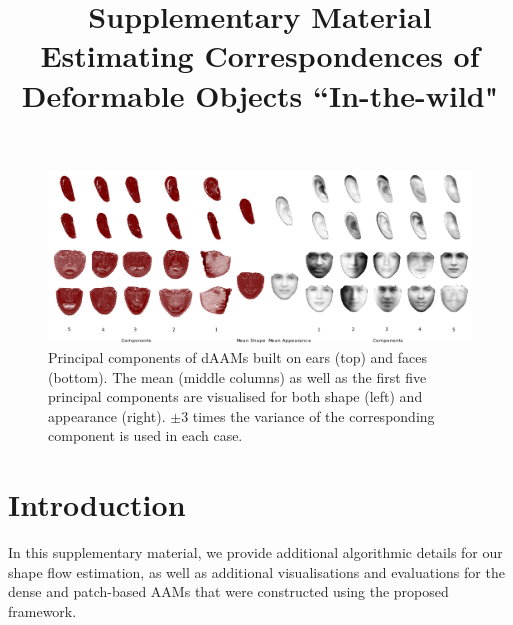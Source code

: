 






\title{Supplementary Material \\ Estimating Correspondences of Deformable Objects ``In-the-wild"}

\maketitle
\thispagestyle{empty}

\begin{figure}[!b]
\centering
\includegraphics[width=\textwidth]{Suplementory_Meterial/Models/models}
\caption{Principal components of dAAMs built on ears (top) and faces (bottom). The mean (middle columns) as well as the first five principal components are visualised for both shape (left) and appearance (right). $\pm 3$ times the variance of the corresponding component is used in each case.}
\label{fig:pcamodel}
\end{figure}


\section*{Introduction}
In this supplementary material, we provide additional algorithmic details for our shape flow estimation, as well as additional visualisations and evaluations for the dense and patch-based AAMs that were constructed using the proposed framework.


